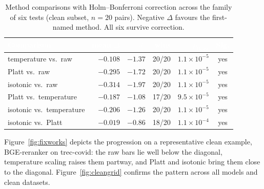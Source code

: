 \documentclass[sn-mathphys-num,pdflatex]{sn-jnl}
\newcommand{\thead}[1]{\textcolor{white}{\textbf{#1}}}
\begin{document}
\begin{table}[t]
\centering
\caption{Method comparisons with Holm--Bonferroni correction across the family of
six tests (clean subset, $n=20$ pairs). Negative $\Delta$ favours the first-named
method. All six survive correction.}\label{tab:stats}
\small
\begin{tabular}{lrrrrc}
\toprule
\rowcolor{headblue}
\thead{Comparison} & \thead{mean $\Delta$} & \thead{$d_z$} & \thead{wins} & \thead{$p_{\text{Holm}}$} & \thead{Sig.} \\
\midrule
\rowcolor{rowlight}
temperature vs.\ raw   & $-0.108$ & $-1.37$ & 20/20 & $1.1\times10^{-5}$ & yes \\
\rowcolor{rowwhite}
Platt vs.\ raw         & $-0.295$ & $-1.72$ & 20/20 & $1.1\times10^{-5}$ & yes \\
\rowcolor{rowlight}
isotonic vs.\ raw      & $-0.314$ & $-1.97$ & 20/20 & $1.1\times10^{-5}$ & yes \\
\rowcolor{rowwhite}
Platt vs.\ temperature & $-0.187$ & $-1.08$ & 17/20 & $9.5\times10^{-5}$ & yes \\
\rowcolor{rowlight}
isotonic vs.\ temperature & $-0.206$ & $-1.26$ & 20/20 & $1.1\times10^{-5}$ & yes \\
\rowcolor{rowwhite}
isotonic vs.\ Platt    & $-0.019$ & $-0.86$ & 18/20 & $1.1\times10^{-4}$ & yes \\
\bottomrule
\end{tabular}
\end{table}

Figure~\ref{fig:fixworks} depicts the progression on a representative clean
example, BGE-reranker on trec-covid: the raw bars lie well below the diagonal,
temperature scaling raises them partway, and Platt and isotonic bring them close
to the diagonal. Figure~\ref{fig:cleangrid} confirms the pattern across all models
and clean datasets.
\end{document}
